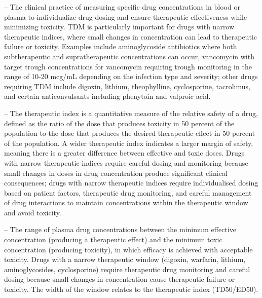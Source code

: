 -- The clinical practice of measuring specific drug concentrations in blood or plasma to individualize drug dosing and ensure therapeutic effectiveness while minimizing toxicity. TDM is particularly important for drugs with narrow therapeutic indices, where small changes in concentration can lead to therapeutic failure or toxicity. Examples include aminoglycoside antibiotics where both subtherapeutic and supratherapeutic concentrations can occur, vancomycin with target trough concentrations for vancomycin requiring trough monitoring in the range of 10-20 mcg/mL depending on the infection type and severity; other drugs requiring TDM include digoxin, lithium, theophylline, cyclosporine, tacrolimus, and certain anticonvulsants including phenytoin and valproic acid.

-- The therapeutic index is a quantitative measure of the relative safety of a drug, defined as the ratio of the dose that produces toxicity in 50 percent of the population to the dose that produces the desired therapeutic effect in 50 percent of the population. A wider therapeutic index indicates a larger margin of safety, meaning there is a greater difference between effective and toxic doses. Drugs with narrow therapeutic indices require careful dosing and monitoring because small changes in doses in drug concentration produce significant clinical consequences; drugs with narrow therapeutic indices require individualised dosing based on patient factors, therapeutic drug monitoring, and careful management of drug interactions to maintain concentrations within the therapeutic window and avoid toxicity.

-- The range of plasma drug concentrations between the minimum effective concentration (producing a therapeutic effect) and the minimum toxic concentration (producing toxicity), in which efficacy is achieved with acceptable toxicity. Drugs with a narrow therapeutic window (digoxin, warfarin, lithium, aminoglycosides, cyclosporine) require therapeutic drug monitoring and careful dosing because small changes in concentration cause therapeutic failure or toxicity. The width of the window relates to the therapeutic index (TD50/ED50).

